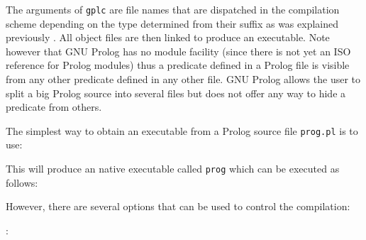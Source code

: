 
The arguments of \texttt{gplc} are file names that are dispatched in the
compilation scheme depending on the type determined from their suffix as was
explained previously . All object files are then
linked to produce an executable. Note however that GNU Prolog has no module
facility (since there is not yet an ISO reference for Prolog modules) thus a
predicate defined in a Prolog file is visible from any other predicate
defined in any other file. GNU Prolog allows the user to split a big Prolog
source into several files but does not offer any way to hide a predicate
from others.

The simplest way to obtain an executable from a Prolog source file
\texttt{prog.pl} is to use:


This will produce an native executable called \texttt{prog} which can be
executed as follows:


However, there are several options that can be used to control the
compilation:

:

